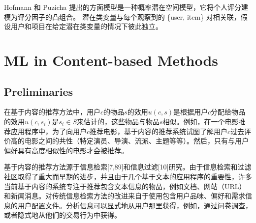 \documentclass[sigconf]{acmart}
\begin{document}
Hofmann 和 Puzicha \cite{hofmann1999latent} 提出的方面模型是一种概率潜在空间模型，它将个人评分建模为评分因子的凸组合。 潜在类变量与每个观察到的 \{user, item\} 对相关联，假设用户和项目在给定潜在类变量的情况下彼此独立。






\section{ML in Content-based Methods}

\subsection{Preliminaries}

在基于内容的推荐方法中，用户$c$的物品$s$的效用$u(c, s)$是根据用户$c$分配给物品的效用$u(c,s_i)$是$s_i\in S$来估计的，这些物品与物品$s$相似。例如，在一个电影推荐应用程序中，为了向用户$c$推荐电影，基于内容的推荐系统试图了解用户$c$过去评价高的电影之间的共性（特定演员、导演、流派、主题等等）。然后，只有与用户偏好具有高度相似性的电影才会被推荐。

基于内容的推荐方法源于信息检索[7,89]和信息过滤[10]研究。由于信息检索和过滤社区取得了重大而早期的进步，并且由于几个基于文本的应用程序的重要性，许多当前基于内容的系统专注于推荐包含文本信息的物品，例如文档、网站（URL）和新闻消息。对传统信息检索方法的改进来自于使用包含用户品味、偏好和需求信息的用户配置文件。分析信息可以显式地从用户那里获得，例如，通过问卷调查，或者隐式地从他们的交易行为中获得。
\end{document}
